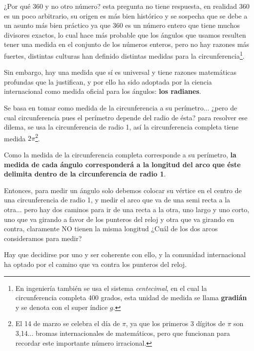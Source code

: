 ¿Por qué 360 y no otro número? esta pregunta no tiene respuesta, en realidad 360 es un poco arbitrario, su origen es más bien histórico y se sospecha que se debe a un asunto más bien práctico ya que 360 es un número entero que tiene muchos divisores exactos, lo cual hace más probable que los ángulos que usamos resulten tener una medida en el conjunto de los números enteros, pero no hay razones más fuertes, distintas culturas han definido distintas medidas para la circunferencia\footnote{En ingeniería también se usa el sistema \emph{centecimal}, en el cual la circunferencia completa 400 grados, esta unidad de medida se llama {\bf gradián} y se denota con el super índice $g$.}.

Sin embargo, hay una medida que sí es universal y tiene razones matemáticas profundas que la justifican, y por ello ha sido adoptada por la ciencia internacional como medida oficial para los ángulos: {\bf los radianes}.

Se basa en tomar como medida de la circunferencia a su perímetro... ¿pero de cual circunferencia pues el perímetro depende del radio de ésta? para resolver ese dilema, se usa la circunferencia de radio 1, así la circunferencia completa tiene medida $2\pi$\footnote{El 14 de marzo se celebra el día de $\pi$, ya que los primeros 3 dígitos de $\pi$ son 3,14... bromas internacionales de matemáticos, pero que funcionan para recordar este importante número irracional.}.

Como la medida de la circunferencia completa corresponde a su perímetro, {\bf la medida de cada ángulo corresponderá a la longitud del arco que éste delimita dentro de la circunferencia de radio 1}.

Entonces, para medir un ángulo solo debemos colocar su vértice en el centro de una circunferencia de radio 1, y medir el arco que va de una semi recta a la otra... pero hay dos caminos para ir de una recta a la otra, uno largo y uno corto, uno que va girando a favor de los punteros del reloj y otra que va girando en contra, claramente NO tienen la misma longitud ¿Cuál de los dos arcos consideramos para medir?

Hay que decidirse por uno y ser coherente con ello, y la comunidad internacional ha optado por el camino que va contra los punteros del reloj. 

\begin{center}
\end{center}

